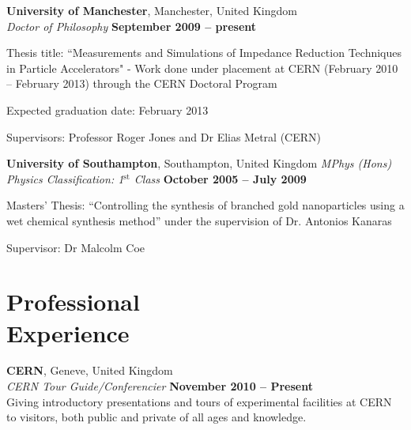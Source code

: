 \documentclass[margin,line]{resume}
\begin{document}
\begin{resume}
    \textbf{University of Manchester}, Manchester, United Kingdom \vspace{2mm}\\\vspace{1mm}%
    \textsl{Doctor of Philosophy} \hfill \textbf{ September 2009 -- present}\vspace{-3mm}\\\vspace{-1mm}%
    \begin{list2}
        \item Thesis title: ``Measurements and Simulations of Impedance Reduction Techniques in Particle Accelerators" - Work done under placement at CERN (February 2010 -- February 2013) through the CERN Doctoral Program
        \item Expected graduation date: February 2013
        \item Supervisors:  Professor Roger Jones and Dr Elias Metral (CERN)
    \end{list2}\vspace{-1.5mm}
    \textbf{ University of Southampton}, Southampton, United Kingdom 
    \textsl{MPhys (Hons) Physics Classification: 1$^{\mathrm{st}}$ Class} \hfill \textbf{October 2005 -- July 2009}\vspace{-3mm}\\\vspace{-1mm}%
    \begin{list2}
        \item Masters' Thesis: ``Controlling the synthesis of branched gold nanoparticles using a wet chemical synthesis method'' under the supervision of Dr. Antonios Kanaras
        \item Supervisor: Dr Malcolm Coe
    \end{list2}\vspace{-1.5mm}

    \section{\mysidestyle Professional\\Experience}


    \textbf{CERN}, Geneve, United Kingdom \vspace{2mm}\\\vspace{1mm}%
    \textsl{CERN Tour Guide/Conferencier} \hfill \textbf{November 2010 -- Present}\\
    Giving introductory presentations and tours of experimental facilities at CERN to visitors, both public and private of all ages and knowledge.


\end{resume}
\end{document}
